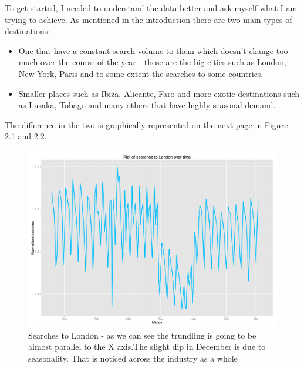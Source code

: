 \documentclass[minf,frontabs,twoside,singlespacing,parskip]{infthesis}
\begin{document}
To get started, I needed to understand the data better and ask myself what I am trying to achieve. As mentioned in the introduction there are two main types of destinations:

\begin{itemize}
\item One that have a constant search volume to them which doesn't change too much over the course of the year - those are the big cities such as London, New York, Paris and to some extent the searches to some countries. 
\item Smaller places such as Ibiza, Alicante, Faro and more exotic destinations such as Lusaka, Tobago and many others that have highly seasonal demand.
\end{itemize}


The difference in the two is graphically represented on the next page in Figure 2.1 and 2.2. 


\begin{figure}[]
\begin{center}
\includegraphics[scale=0.4]{london-searches}
\end{center}
\caption{Searches to London - as we can see the trundling is going to be almost parallel to the X axis.The slight dip in December is due to seasonality. That is noticed across the industry as a whole}
\end{figure}
\end{document}
